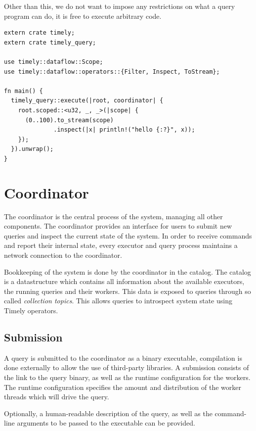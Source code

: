 Other than this, we do not want to impose any restrictions on what a query program
can do, it is free to execute arbitrary code.

\begin{lstlisting}[caption={[Example query.]Example query which prints out a stream of integers.}]
extern crate timely;
extern crate timely_query;

use timely::dataflow::Scope;
use timely::dataflow::operators::{Filter, Inspect, ToStream};

fn main() {
  timely_query::execute(|root, coordinator| {
    root.scoped::<u32, _, _>(|scope| {
      (0..100).to_stream(scope)
              .inspect(|x| println!("hello {:?}", x));
    });
  }).unwrap();
}
\end{lstlisting}

\section{Coordinator}

The coordinator is the central process of the system, managing all other
components. 
The coordinator provides an interface for users to submit new queries and
inspect the current state of the system. In order to receive commands and
report their internal state, every executor and query process maintains a
network connection to the coordinator.

Bookkeeping of the system is done by the coordinator in the catalog. The
catalog is a datastructure which contains all information about the available
executors, the running queries and their workers. This data is exposed to
queries through so called \emph{collection topics}. This allows queries
to introspect system state using Timely operators.

\subsection{Submission}

A query is submitted to the coordinator as a binary executable, compilation
is done externally to allow the use of third-party libraries. A submission
consists of the link to the query binary, as well as the runtime
configuration for the workers. The runtime configuration specifies the amount
and distribution of the worker threads which will drive the query.

Optionally, a human-readable description of the query,
as well as the command-line arguments to be passed to the executable can be
provided.

